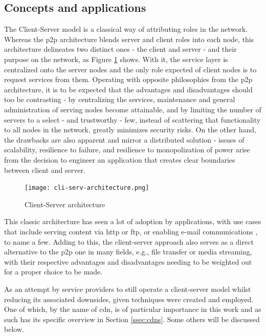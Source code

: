 \subsection{Concepts and applications}

    The Client-Server model is a classical way of attributing roles in the network.
    Whereas the \gls{p2p} architecture blends server and client roles into each node, this architecture delineates two distinct ones - the client and server - and their purpose on the network, as Figure \ref{fig:cli-serv-architecture} shows.
    With it, the service layer is centralized onto the server nodes and the only role expected of client nodes is to request services from them.
    Operating with opposite philosophies from the \gls{p2p} architecture, it is to be expected that the advantages and disadvantages should too be contrasting - by centralizing the services, maintenance and general administration of serving nodes become attainable, and by limiting the number of servers to a select - and trustworthy - few, instead of scattering that functionality to all nodes in the network, greatly minimizes security risks.
    On the other hand, the drawbacks are also apparent and mirror a distributed solution - issues of scalability, resilience to failure, and resilience to monopolization of power arise from the decision to engineer an application that creates clear boundaries between client and server.

    \begin{figure}[!h]
    \centering
    \texttt{[image: cli-serv-architecture.png]}
    \caption{Client-Server architecture \cite{cliserv-p2p}}
    \label{fig:cli-serv-architecture}
    \end{figure}

    This classic architecture has seen a lot of adoption by applications, with use cases that include serving content via \gls{http} or \gls{ftp}, or enabling e-mail communications \cite{cliserv-p2p}, to name a few.
    Adding to this, the client-server approach also serves as a direct alternative to the \gls{p2p} one in many fields, e.g., file transfer or media streaming, with their respective advantages and disadvantages needing to be weighted out for a proper choice to be made.

    As an attempt by service providers to still operate a client-server model whilst reducing its associated downsides, given techniques were created and employed.
    One of which, by the name of \gls{cdn}, is of particular importance in this work and as such has its specific overview in Section \ref{ssec:cdns}.
    Some others will be discussed below.


